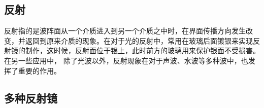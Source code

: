 
\begin{issues}
\issueDraft
\issueMissDepend
\end{issues}

\subsection{反射}
反射指的是波阵面从一个介质进入到另一个介质之中时，在界面传播方向发生改变，并返回到原来介质的现象。在对于光的反射中，常用在玻璃后面镀银来实现反射镜的制作，这时候，反射面位于银上，此时前方的玻璃用来保护银面不受损害。在另一些应用中，
除了光波以外，反射现象在对于声波、水波等多种波中，也发挥了重要的作用。
\subsection{多种反射镜}
